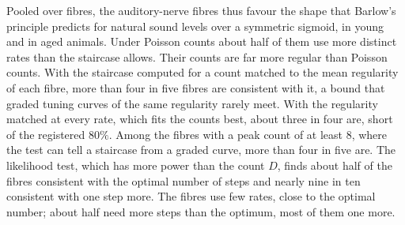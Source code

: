 Pooled over fibres, the auditory-nerve fibres thus favour the shape that Barlow's principle predicts for natural sound levels over a
symmetric sigmoid, in young and in aged animals. Under Poisson counts about half of them use more distinct rates than the staircase allows. Their
counts are far more regular than Poisson counts. With the staircase computed for a count matched to the mean regularity of each fibre,
more than four in five fibres are consistent with it, a bound that graded tuning curves of the same regularity rarely meet. With the
regularity matched at every rate, which fits the counts best, about three in four are, short of the registered $80\%$. Among the
fibres with a peak count of at least 8, where the test can tell a staircase from a graded curve, more than four in five are. The
likelihood test, which has more power than the count $D$, finds about half of the fibres consistent with the optimal number of
steps and nearly nine in ten consistent with one step more. The fibres use few rates, close to the optimal number; about half
need more steps than the optimum, most of them one more.
